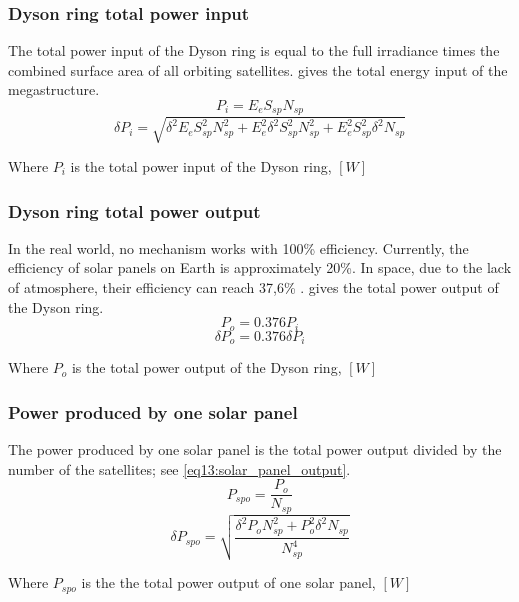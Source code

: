 \documentclass[stu, 11pt, a4paper, floatsintext]{apa7}
\begin{document}
	\subsubsection{Dyson ring total power input}
	The total power input of the Dyson ring is equal to the full irradiance times the combined surface area of all orbiting satellites.  gives the total energy input of the megastructure.
	\begin{equation}
		\label{eq11:dyson_ring_input}
		P_i=E_eS_{sp}N_{sp}
	\end{equation}
	\begin{equation*}
		\delta P_i=\sqrt{\delta^2E_eS_{sp}^2N_{sp}^2+E_e^2\delta^2S_{sp}^2N_{sp}^2+E_e^2S_{sp}^2\delta^2N_{sp}}
	\end{equation*}
	\begin{center}
		Where $P_{i}$ is the total power input of the Dyson ring, $[W]$
	\end{center}
	\subsubsection{Dyson ring total power output}
	In the real world, no mechanism works with 100\% efficiency. Currently, the efficiency of solar panels on Earth is approximately 20\%. In space, due to the lack of atmosphere, their efficiency can reach 37,6\% \Parencite{kotamraju_modeling_2019}.  gives the total power output of the Dyson ring.
	\begin{equation}
		\label{eq12:dyson_ring_output}
		P_o=0.376P_i
	\end{equation}
	\begin{equation*}
		\delta P_o=0.376\delta P_i
	\end{equation*}
	\begin{center}
		Where $P_{o}$ is the total power output of the Dyson ring, $[W]$
	\end{center}
	\subsubsection{Power produced by one solar panel}
	The power produced by one solar panel is the total power output divided by the number of the satellites; see \cref{eq13:solar_panel_output}.
	\begin{equation}
		\label{eq13:solar_panel_output}
		P_{spo}=\frac{P_o}{N_{sp}}
	\end{equation}
	\begin{equation*}
		\delta P_{spo}=\sqrt{\frac{\delta^2P_oN_{sp}^2+P_o^2\delta^2N_{sp}}{N_{sp}^4}}
	\end{equation*}
	\begin{center}
		Where $P_{spo}$ is the the total power output of one solar panel, $[W]$
	\end{center}
\end{document}
